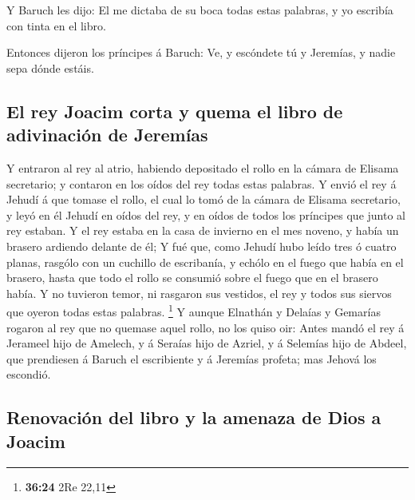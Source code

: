  Y Baruch les dijo: El me dictaba de su boca todas estas
palabras, y yo escribía con tinta en el libro.

 Entonces dijeron los príncipes á Baruch: Ve, y escóndete
tú y Jeremías, y nadie sepa dónde estáis.

\hypertarget{el-rey-joacim-corta-y-quema-el-libro-de-adivinaciuxf3n-de-jeremuxedas}{%
\subsection{El rey Joacim corta y quema el libro de adivinación de
Jeremías}\label{el-rey-joacim-corta-y-quema-el-libro-de-adivinaciuxf3n-de-jeremuxedas}}

 Y entraron al rey al atrio, habiendo depositado el rollo
en la cámara de Elisama secretario; y contaron en los oídos del rey
todas estas palabras.  Y envió el rey á Jehudí á que tomase
el rollo, el cual lo tomó de la cámara de Elisama secretario, y leyó en
él Jehudí en oídos del rey, y en oídos de todos los príncipes que junto
al rey estaban.  Y el rey estaba en la casa de invierno en
el mes noveno, y había un brasero ardiendo delante de él; 
Y fué que, como Jehudí hubo leído tres ó cuatro planas, rasgólo con un
cuchillo de escribanía, y echólo en el fuego que había en el brasero,
hasta que todo el rollo se consumió sobre el fuego que en el brasero
había.  Y no tuvieron temor, ni rasgaron sus vestidos, el
rey y todos sus siervos que oyeron todas estas palabras. \footnote{\textbf{36:24}
  2Re 22,11}  Y aunque Elnathán y Delaías y Gemarías
rogaron al rey que no quemase aquel rollo, no los quiso oir:
 Antes mandó el rey á Jerameel hijo de Amelech, y á Seraías
hijo de Azriel, y á Selemías hijo de Abdeel, que prendiesen á Baruch el
escribiente y á Jeremías profeta; mas Jehová los escondió.

\hypertarget{renovaciuxf3n-del-libro-y-la-amenaza-de-dios-a-joacim}{%
\subsection{Renovación del libro y la amenaza de Dios a
Joacim}\label{renovaciuxf3n-del-libro-y-la-amenaza-de-dios-a-joacim}}

